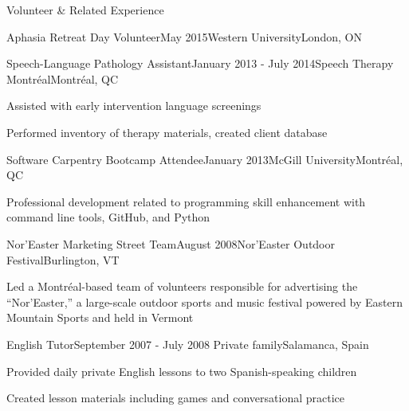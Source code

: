 \documentclass{resume} %
\begin{document}
\begin{rSection}{Volunteer \& Related Experience}
\begin{rSubsection}{Aphasia Retreat Day Volunteer}{May 2015}{Western University}{London, ON}
	\end{rSubsection}
	
	
	
	\begin{rSubsection}{Speech-Language Pathology Assistant}{January 2013 - July 2014}{Speech Therapy Montr\'eal}{Montr\'eal, QC}
	\item Assisted with early intervention language screenings
	\item Performed inventory of therapy materials, created client database
	\end{rSubsection}
	
	
	\begin{rSubsection}{Software Carpentry Bootcamp Attendee}{January 2013}{McGill University}{Montr\'eal, QC}
	\item Professional development related to programming skill enhancement with command line tools, GitHub, and Python
	\end{rSubsection}
	
	
	\begin{rSubsection}{Nor'Easter Marketing Street Team}{August 2008}{Nor'Easter Outdoor Festival}{Burlington, VT}
	\item Led a Montr\'eal-based team of volunteers responsible for advertising the ``Nor'Easter,'' a large-scale outdoor sports and music festival powered by Eastern Mountain Sports and held in Vermont
	\end{rSubsection}
	
	
	\begin{rSubsection}{English Tutor}{September 2007 - July 2008}{ Private family}{Salamanca, Spain}
	\item Provided daily private English lessons to two Spanish-speaking children
	\item Created lesson materials including games and conversational practice
	\end{rSubsection}
	

\end{rSection}



\end{document}
